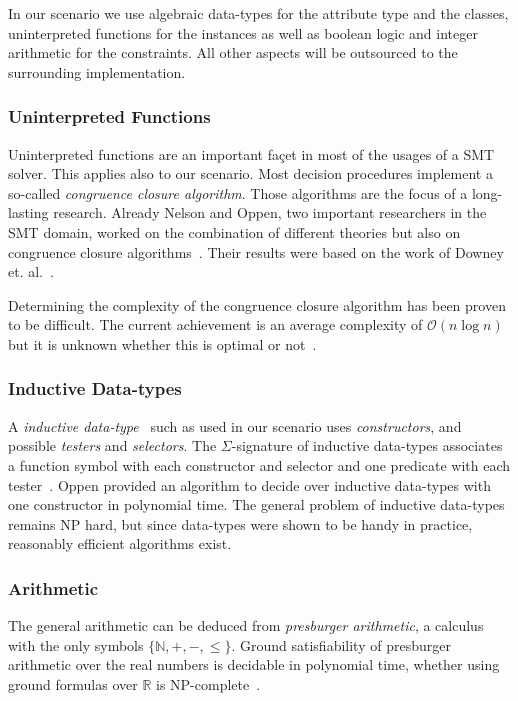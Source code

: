 In our scenario we use algebraic data-types for the attribute type and the classes, uninterpreted functions for the instances as well as boolean logic and integer arithmetic for the constraints. All other aspects will be outsourced to the surrounding implementation.

\subsubsection*{Uninterpreted Functions}

Uninterpreted functions are an important fa\c{c}et in most of the usages of a SMT solver. This applies also to our scenario. Most decision procedures implement a so-called \emph{congruence closure algorithm}. Those algorithms are the focus of a long-lasting research. Already Nelson and Oppen, two important researchers in the SMT domain, worked on the combination of different theories but also on congruence closure algorithms~\cite{nels-oppen}. Their results were based on the work of Downey et. al.~\cite{congruence-closure}. 

Determining the complexity of the congruence closure algorithm has been proven to be difficult. The current achievement is an average complexity of $\mathcal{O}(n \log n)$ but it is unknown whether this is optimal or not~\cite{smt-challenge}.





\subsubsection*{Inductive Data-types}

A \emph{inductive data-type}~\cite{smt-book} such as used in our scenario uses \emph{constructors}, and possible \emph{testers} and \emph{selectors}. The  $\Sigma$-signature of inductive data-types associates a function symbol with each constructor and selector and one predicate with each tester~\cite{smt-book}. Oppen provided an algorithm to decide over inductive data-types with one constructor in polynomial time. The general problem of inductive data-types remains NP hard, but since data-types were shown to be handy in practice, reasonably efficient algorithms exist.

\subsubsection*{Arithmetic}
The general arithmetic can be deduced from \emph{presburger arithmetic}, a calculus with the only symbols $\{\mathbb{N}, +, -, \leq\}$. Ground satisfiability of presburger arithmetic over the real numbers is decidable in polynomial time, whether using ground formulas over $\mathbb{R}$ is NP-complete~\cite{smt-book}.


